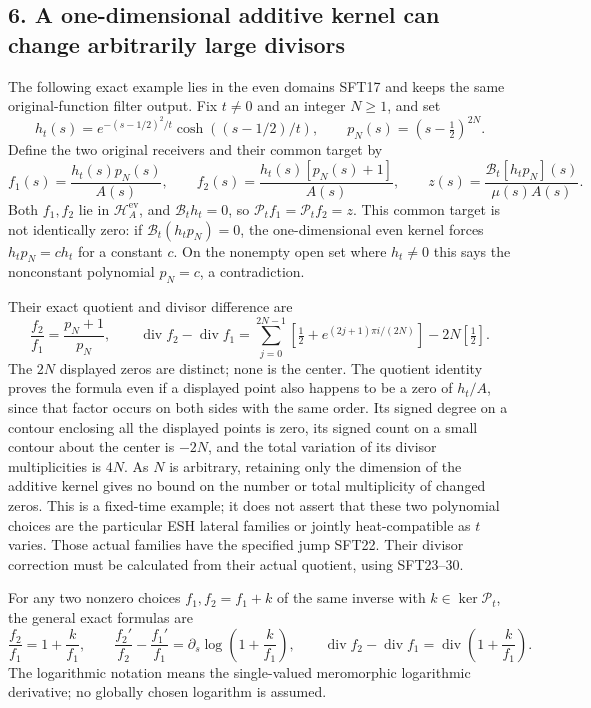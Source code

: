 \documentclass[
  10pt,
  a4paper,
]{article}
\begin{document}
\subsection{6. A one-dimensional additive kernel can change arbitrarily
large
divisors}\label{a-one-dimensional-additive-kernel-can-change-arbitrarily-large-divisors}

The following exact example lies in the even domains SFT17 and keeps the
same original-function filter output. Fix \(t\ne0\) and an integer
\(N\ge1\), and set \[
 h_t(s)=e^{-(s-1/2)^2/t}\cosh((s-1/2)/t),\qquad
 p_N(s)=(s-\tfrac12)^{2N}.
\] Define the two original receivers and their common target by \[
 f_1(s)=\frac{h_t(s)p_N(s)}{A(s)},\qquad
 f_2(s)=\frac{h_t(s)[p_N(s)+1]}{A(s)},\qquad
 z(s)=\frac{\mathcal B_t[h_t p_N](s)}{\mu(s)A(s)}.
 \tag{SFT31}
\] Both \(f_1,f_2\) lie in \(\mathcal H_A^{\mathrm{ev}}\), and
\(\mathcal B_th_t=0\), so \(\mathcal P_tf_1=\mathcal P_tf_2=z\). This
common target is not identically zero: if \(\mathcal B_t(h_tp_N)=0\),
the one-dimensional even kernel forces \(h_tp_N=c h_t\) for a constant
\(c\). On the nonempty open set where \(h_t\ne0\) this says the
nonconstant polynomial \(p_N=c\), a contradiction.

Their exact quotient and divisor difference are \[
 \frac{f_2}{f_1}=\frac{p_N+1}{p_N},\qquad
 \operatorname{div}f_2-\operatorname{div}f_1
   =\sum_{j=0}^{2N-1}
       [\tfrac12+e^{(2j+1)\pi i/(2N)}]
                     -2N[\tfrac12].
 \tag{SFT32}
\] The \(2N\) displayed zeros are distinct; none is the center. The
quotient identity proves the formula even if a displayed point also
happens to be a zero of \(h_t/A\), since that factor occurs on both
sides with the same order. Its signed degree on a contour enclosing all
the displayed points is zero, its signed count on a small contour about
the center is \(-2N\), and the total variation of its divisor
multiplicities is \(4N\). As \(N\) is arbitrary, retaining only the
dimension of the additive kernel gives no bound on the number or total
multiplicity of changed zeros. This is a fixed-time example; it does not
assert that these two polynomial choices are the particular ESH lateral
families or jointly heat-compatible as \(t\) varies. Those actual
families have the specified jump SFT22. Their divisor correction must be
calculated from their actual quotient, using SFT23--30.

For any two nonzero choices \(f_1,f_2=f_1+k\) of the same inverse with
\(k\in\ker\mathcal P_t\), the general exact formulas are \[
 \frac{f_2}{f_1}=1+\frac{k}{f_1},\qquad
 \frac{f_2'}{f_2}-\frac{f_1'}{f_1}
      =\partial_s\log\!\left(1+\frac{k}{f_1}\right),\qquad
 \operatorname{div}f_2-\operatorname{div}f_1
      =\operatorname{div}\!\left(1+\frac{k}{f_1}\right).
 \tag{SFT33}
\] The logarithmic notation means the single-valued meromorphic
logarithmic derivative; no globally chosen logarithm is assumed.
\end{document}
